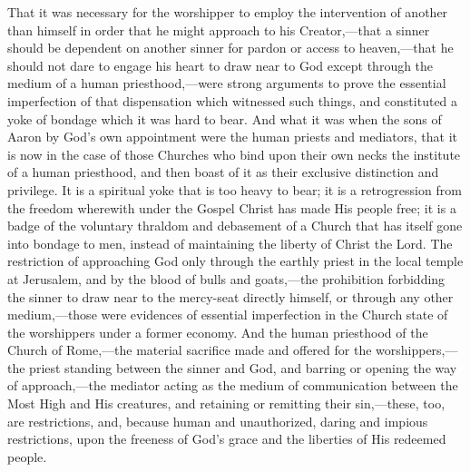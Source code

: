 \documentclass[
]{book}
\begin{document}
That it was necessary for the worshipper to employ the intervention of another than himself in order that he might approach to his Creator,---that a sinner should be dependent on another sinner for pardon or access to heaven,---that he should not dare to engage his heart to draw near to God except through the medium of a human priesthood,---were strong arguments to prove the essential imperfection of that dispensation which witnessed such things, and constituted a yoke of bondage which it was hard to bear. And what it was when the sons of Aaron by God's own appointment were the human priests and mediators, that it is now in the case of those Churches who bind upon their own necks the institute of a human priesthood, and then boast of it as their exclusive distinction and privilege. It is a spiritual yoke that is too heavy to bear; it is a retrogression from the freedom wherewith under the Gospel Christ has made His people free; it is a badge of the voluntary thraldom and debasement of a Church that has itself gone into bondage to men, instead of maintaining the liberty of Christ the Lord. The restriction of approaching God only through the earthly priest in the local temple at Jerusalem, and by the blood of bulls and goats,---the prohibition forbidding the sinner to draw near to the mercy-seat directly himself, or through any other medium,---those were evidences of essential imperfection in the Church state of the worshippers under a former economy. And the human priesthood of the Church of Rome,---the material sacrifice made and offered for the worshippers,---the priest standing between the sinner and God, and barring or opening the way of approach,---the mediator acting as the medium of communication between the Most High and His creatures, and retaining or remitting their sin,---these, too, are restrictions, and, because human and unauthorized, daring and impious restrictions, upon the freeness of God's grace and the liberties of His redeemed people.
\end{document}

